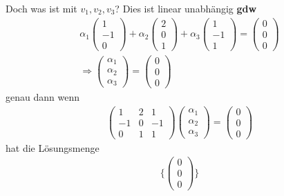 \documentclass[11pt]{report}
\newcommand*\f[1] {\textbf{#1}}
\begin{document}
Doch was ist mit ${v_1, v_2, v_3}$? Dies ist linear unabhängig \f{gdw}
\begin{align}
 \alpha_1 \begin{pmatrix} 1 \\ -1 \\ 0 \end{pmatrix} + \alpha_2 \begin{pmatrix} 2 \\ 0 \\ 1 \end{pmatrix} + \alpha_3 \begin{pmatrix} 1 \\ -1 \\ 1 \end{pmatrix} = \begin{pmatrix} 0 \\ 0 \\ 0 \end{pmatrix} \\
\Rightarrow \begin{pmatrix} \alpha_1 \\ \alpha_2 \\ \alpha_3 \end{pmatrix} = \begin{pmatrix} 0 \\ 0 \\ 0 \end{pmatrix}
\end{align}
genau dann wenn
\begin{align}
 \begin{pmatrix} 1  & 2 & 1 \\ -1 & 0 & -1 \\ 0 & 1 & 1 \end{pmatrix} \begin{pmatrix} \alpha_1 \\ \alpha_2 \\ \alpha_3 \end{pmatrix} = \begin{pmatrix} 0 \\ 0 \\ 0 \end{pmatrix}
\end{align}
hat die Lösungsmenge
\begin{align}
 \{\begin{pmatrix} 0 \\ 0 \\ 0 \end{pmatrix}\}
\end{align}
\end{document}

